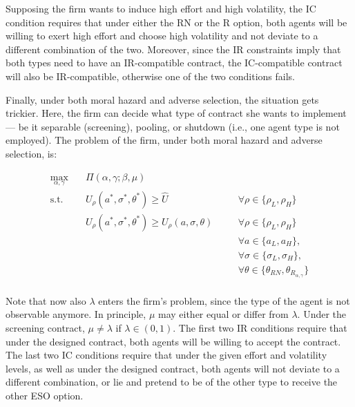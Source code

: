 Supposing the firm wants to induce high effort and high volatility, the IC condition requires that under either the RN or the R option, both agents will be willing to exert high effort and choose high volatility and not deviate to a different combination of the two. Moreover, since the IR constraints imply that both types need to have an IR-compatible contract, the IC-compatible contract will also be IR-compatible, otherwise one of the two conditions fails.


Finally, under both moral hazard and adverse selection, the situation gets trickier. Here, the firm can decide what type of contract she wants to implement --- be it separable (screening), pooling, or shutdown (i.e., one agent type is not employed). The problem of the firm, under both moral hazard and adverse selection, is:

\begin{equation}
    \label{eqn:pbl_bestIII_screening}
    \begin{alignedat}{2}
        \max_{\alpha, \gamma} \quad & \Pi (\alpha, \gamma; \beta, \mu) \\
        \textrm{s.t.}       \quad & U_{\rho}(a^*, \sigma^*, \theta^*) \ge \hat{U} & \quad & \forall \rho \in \{ \rho_L, \rho_H \}\\
                            \quad & U_{\rho}(a^*, \sigma^*, \theta^*) \ge U_{\rho}(a, \sigma, \theta) &\quad& \forall \rho \in \{ \rho_L, \rho_H \}\\
                            \quad & &\quad& \forall a \in \{ a_L, a_H \}, \\
                            \quad & &\quad& \forall \sigma \in \{ \sigma_L, \sigma_H \}, \\
                            \quad & &\quad& \forall \theta \in \{ \theta_{RN}, \theta_{R_{\alpha, \gamma}} \} \\ 
    \end{alignedat}
\end{equation}
\vspace*{4pt}



Note that now also $\lambda$ enters the firm's problem, since the type of the agent is not observable anymore. In principle, $\mu$ may either equal or differ from $\lambda$. Under the screening contract, $\mu \neq \lambda$ if $\lambda \in (0,1)$.
The first two IR conditions require that under the designed contract, both agents will be willing to accept the contract. The last two IC conditions require that under the given effort and volatility levels, as well as under the designed contract, both agents will not deviate to a different combination, or lie and pretend to be of the other type to receive the other ESO option.


